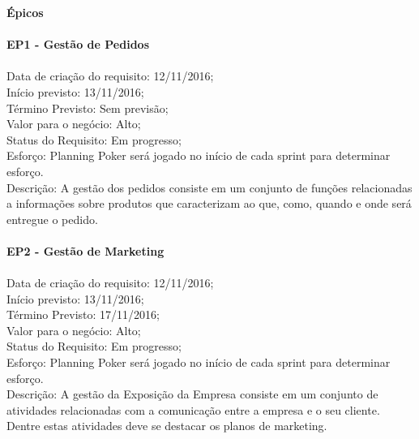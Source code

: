 \begin{apendicesenv}
\textbf{Épicos} \\
\\
\textbf{EP1 - Gestão de Pedidos} \\ \\
\tab Data de criação do requisito: 12/11/2016;\\
\tab Início previsto: 13/11/2016;\\
\tab Término Previsto: Sem previsão;\\
\tab Valor para o negócio: Alto;\\
\tab Status do Requisito: Em progresso;\\
\tab Esforço: Planning Poker será jogado no início de cada sprint para determinar esforço.\\
\tab Descrição: A gestão dos pedidos consiste em um conjunto de funções relacionadas a informações sobre produtos que caracterizam ao que, como, quando e onde será entregue o pedido.\\
\\
\textbf{EP2 - Gestão de Marketing} \\ \\
\tab Data de criação do requisito: 12/11/2016;\\
\tab Início previsto: 13/11/2016;\\
\tab Término Previsto: 17/11/2016;\\
\tab Valor para o negócio: Alto;\\
\tab Status do Requisito: Em progresso;\\
\tab Esforço: Planning Poker será jogado no início de cada sprint para determinar esforço.\\
\tab Descrição:  A gestão da Exposição da Empresa consiste em um conjunto de atividades relacionadas com a comunicação entre a empresa e o seu cliente. Dentre estas atividades deve se destacar os planos de marketing.\\
\\


\end{apendicesenv}
